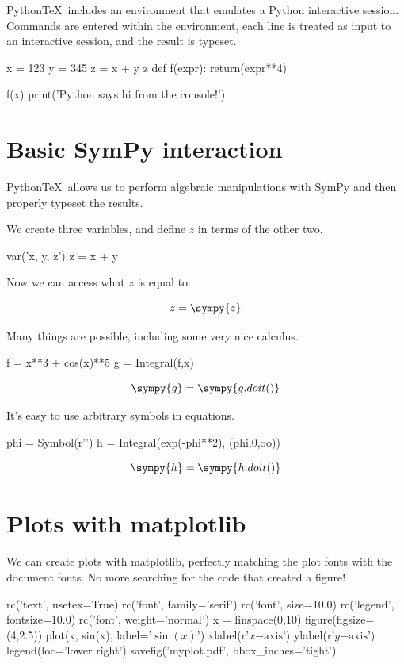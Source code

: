 \documentclass[11pt]{article}
\newcommand{\pytex}{Python\TeX}
\begin{document}
\pytex\ includes an environment that emulates a Python interactive session.  Commands are entered within the environment, each line is treated as input to an interactive session, and the result is typeset.

\begin{pyconsole}[][frame=single]
x = 123
y = 345
z = x + y
z
def f(expr):
    return(expr**4)

f(x)
print('Python says hi from the console!')
\end{pyconsole}


\section{Basic SymPy interaction}

\pytex\ allows us to perform algebraic manipulations with SymPy and then properly typeset the results.

We create three variables, and define $z$ in terms of the other two.

\begin{sympyblock}
var('x, y, z')
z = x + y
\end{sympyblock}

Now we can access what $z$ is equal to:

\[z=\sympy{z}\]

Many things are possible, including some very nice calculus.

\begin{sympyblock}
f = x**3 + cos(x)**5
g = Integral(f,x)
\end{sympyblock}

\[\sympy{g}=\sympy{g.doit()}\]

It's easy to use arbitrary symbols in equations.

\begin{sympyblock}
phi = Symbol(r'\phi')
h = Integral(exp(-phi**2), (phi,0,oo))
\end{sympyblock}

\[\sympy{h}=\sympy{h.doit()}\]



\section{Plots with matplotlib}

We can create plots with matplotlib, perfectly matching the plot fonts with the document fonts.  No more searching for the code that created a figure!

\begin{pylabblock}
rc('text', usetex=True)
rc('font', family='serif')
rc('font', size=10.0)
rc('legend', fontsize=10.0)
rc('font', weight='normal')
x = linspace(0,10)
figure(figsize=(4,2.5))
plot(x, sin(x), label='$\sin(x)$')
xlabel(r'$x\mathrm{-axis}$')
ylabel(r'$y\mathrm{-axis}$')
legend(loc='lower right')
savefig('myplot.pdf', bbox_inches='tight')
\end{pylabblock}
\end{document}

